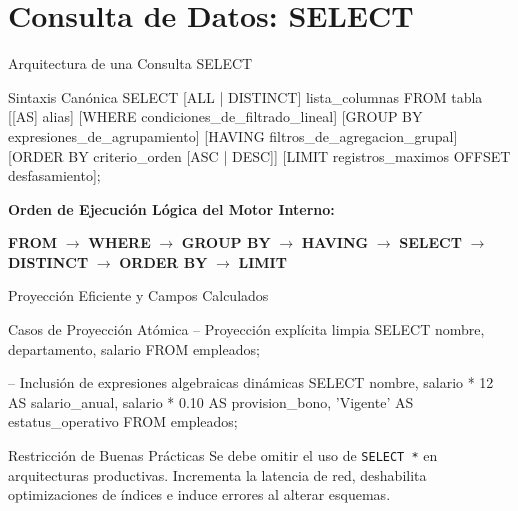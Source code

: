 \documentclass[12pt, aspectratio=169, UTF8]{beamer}
\begin{document}
\section{Consulta de Datos: SELECT}

\begin{frame}[fragile]{Arquitectura de una Consulta SELECT}
  \begin{sqlbox}{Sintaxis Canónica}
SELECT [ALL | DISTINCT] lista_columnas
FROM tabla [[AS] alias]
[WHERE condiciones_de_filtrado_lineal]
[GROUP BY expresiones_de_agrupamiento]
[HAVING filtros_de_agregacion_grupal]
[ORDER BY criterio_orden [ASC | DESC]]
[LIMIT registros_maximos OFFSET desfasamiento];
  \end{sqlbox}
  \vspace{2pt}
  \textbf{Orden de Ejecución Lógica del Motor Interno:}
  \begin{center}
    \footnotesize
    \color{sqlblue}\textbf{FROM} $\rightarrow$ \textbf{WHERE} $\rightarrow$ \textbf{GROUP BY} $\rightarrow$ \textbf{HAVING} $\rightarrow$ \textbf{SELECT} $\rightarrow$ \textbf{DISTINCT} $\rightarrow$ \textbf{ORDER BY} $\rightarrow$ \textbf{LIMIT}
  \end{center}
\end{frame}

\begin{frame}[fragile]{Proyección Eficiente y Campos Calculados}
  \begin{sqlbox}{Casos de Proyección Atómica}
-- Proyección explícita limpia
SELECT nombre, departamento, salario 
FROM empleados;

-- Inclusión de expresiones algebraicas dinámicas
SELECT nombre,
       salario * 12 AS salario_anual,
       salario * 0.10 AS provision_bono,
       'Vigente' AS estatus_operativo
FROM empleados;
  \end{sqlbox}
  \begin{alertblock}{Restricción de Buenas Prácticas}
    Se debe omitir el uso de \texttt{SELECT *} en arquitecturas productivas. Incrementa la latencia de red, deshabilita optimizaciones de índices e induce errores al alterar esquemas.
  \end{alertblock}
\end{frame}
\end{document}
